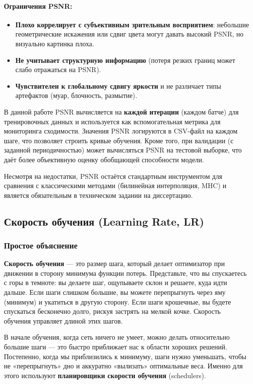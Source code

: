 \documentclass[12pt,a4paper]{article}
\begin{document}
\paragraph{Ограничения PSNR:}
\begin{itemize}
    \item \textbf{Плохо коррелирует с субъективным зрительным восприятием}: небольшие геометрические искажения или сдвиг цвета могут давать высокий PSNR, но визуально картинка плоха.
    \item \textbf{Не учитывает структурную информацию} (потеря резких границ может слабо отражаться на PSNR).
    \item \textbf{Чувствителен к глобальному сдвигу яркости} и не различает типы артефактов (муар, блочность, размытие).
\end{itemize}

В данной работе PSNR вычисляется на \textbf{каждой итерации} (каждом батче) для тренировочных данных и используется как вспомогательная метрика для мониторинга сходимости. Значения PSNR логируются в CSV-файл на каждом шаге, что позволяет строить кривые обучения. Кроме того, при валидации (с заданной периодичностью) может вычисляться PSNR на тестовой выборке, что даёт более объективную оценку обобщающей способности модели.

Несмотря на недостатки, PSNR остаётся стандартным инструментом для сравнения с классическими методами (билинейная интерполяция, MHC) и является обязательным в техническом задании на диссертацию.

\subsection{Скорость обучения (Learning Rate, LR)}

\subsubsection{Простое объяснение}

\textbf{Скорость обучения} — это размер шага, который делает оптимизатор при движении в сторону минимума функции потерь. Представьте, что вы спускаетесь с горы в темноте: вы делаете шаг, ощупываете склон и решаете, куда идти дальше. Если шаги слишком большие, вы можете перепрыгнуть через яму (минимум) и укатиться в другую сторону. Если шаги крошечные, вы будете спускаться бесконечно долго, рискуя застрять на мелкой кочке. Скорость обучения управляет длиной этих шагов.

В начале обучения, когда сеть ничего не умеет, можно делать относительно большие шаги — это быстро приближает нас к области хороших решений. Постепенно, когда мы приблизились к минимуму, шаги нужно уменьшать, чтобы не «перепрыгнуть» дно и аккуратно «вылизать» оптимальные веса. Именно для этого используют \textbf{планировщики скорости обучения} (schedulers).
\end{document}
